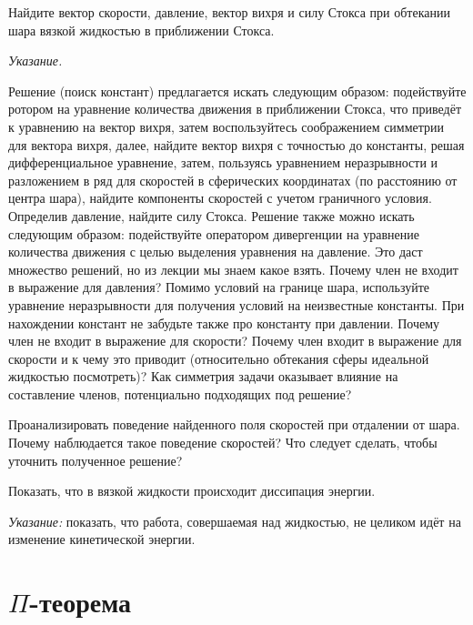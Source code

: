 \documentclass[a4paper, 14pt]{extarticle}
\begin{document}
\begin{problems}
	
	\item Найдите вектор скорости, давление, вектор вихря и силу Стокса при обтекании шара вязкой жидкостью в приближении Стокса.
	
	{\small
	\textit{Указание.}	
	
	Решение (поиск констант) предлагается искать следующим образом: подействуйте ротором на уравнение количества движения в приближении Стокса, что приведёт к уравнению на вектор вихря, затем воспользуйтесь соображением симметрии для вектора вихря, далее, найдите вектор вихря с точностью до константы, решая дифференциальное уравнение, затем, пользуясь уравнением неразрывности и разложением в ряд для скоростей в сферических координатах (по расстоянию от центра шара), найдите компоненты скоростей с учетом граничного условия. Определив давление, найдите силу Стокса.  \newline		
	Решение  также можно искать следующим образом: подействуйте оператором дивергенции на уравнение количества движения с целью выделения уравнения на давление. Это даст множество решений, но из лекции мы знаем какое взять. Почему член  не входит в выражение для давления? Помимо условий на границе шара, используйте уравнение неразрывности для получения условий на неизвестные константы. При нахождении констант не забудьте также про константу при давлении. Почему член  не входит в выражение для скорости? Почему член  входит в выражение для скорости и к чему это приводит (относительно обтекания сферы идеальной жидкостью посмотреть)? Как симметрия задачи оказывает влияние на составление членов, потенциально подходящих под решение?
	}

	\item 
	Проанализировать поведение найденного поля скоростей при отдалении от шара. Почему наблюдается такое поведение скоростей? Что следует сделать, чтобы уточнить полученное решение? 
	
	\item
	Показать, что в вязкой жидкости происходит диссипация энергии.
	 
	{\small \textit{Указание:} показать, что работа, совершаемая над жидкостью, не целиком идёт на изменение кинетической энергии.}

\end{problems}

\section{$\Pi$-теорема}
\end{document}
